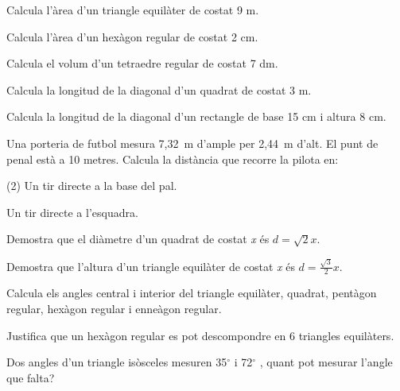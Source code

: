 \begin{mylist}

\exer  Calcula l'àrea d'un triangle equilàter de costat 9 m. 

\exer  Calcula l'àrea d'un hexàgon regular de costat 2 cm. 

\exer  \hot Calcula el volum d'un tetraedre regular de costat 7 dm.

\exer  Calcula la longitud de la diagonal d'un quadrat de costat 3 m.

\exer  Calcula la longitud de la diagonal d'un rectangle de base 15 cm i altura 8 cm.
\answers{17 cm}

\exer  Una porteria de futbol mesura 7,32~m d'ample per 2,44~m d'alt. El punt de penal està a 10 metres. Calcula la distància que recorre la pilota en:

\begin{tasks}(2)
	\task  Un tir directe a la base del pal.

 
	\task  Un tir directe a l'esquadra.
\end{tasks}
\answers{[10.65 m, 10.92 m]}


\exer  Demostra que el diàmetre d'un quadrat de costat \textit{x} és $d=\sqrt{2} x$.
 

\exer  Demostra que l'altura d'un triangle equilàter de costat \textit{x} és $d=\frac{\sqrt{3} }{2} x$. 
 

\exer  Calcula els angles central i interior del triangle equilàter, quadrat, pentàgon regular, hexàgon regular i enneàgon regular.

\exer  Justifica que un hexàgon regular es pot descompondre en 6 triangles equilàters.

\exer  Dos angles d'un triangle isòsceles mesuren 35${}^\circ$  i 72${}^\circ$ , quant pot mesurar l'angle que falta?


\end{mylist}
